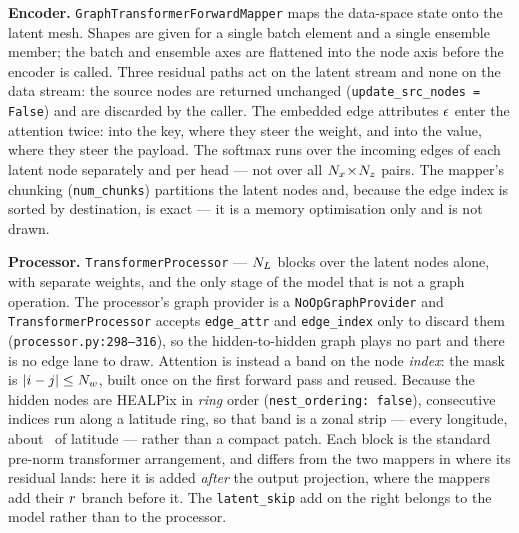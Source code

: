 \documentclass[11pt,landscape]{article}
\begin{document}
\vspace*{\fill}
\begin{center}
  \resizebox{\textwidth}{!}{}
\end{center}
\vspace*{\fill}

{\footnotesize
    \textbf{Encoder.}\;
    \texttt{GraphTransformerForwardMapper} maps the data-space
    state onto the latent mesh.
    Shapes are given for a single batch element and a
    single ensemble member; the batch and ensemble axes are flattened into the node
    axis before the encoder is called.
    Three residual paths act on the latent
    stream and none on the data stream: the source nodes are returned unchanged
    (\texttt{update\_src\_nodes = False}) and are discarded by the caller.
    The embedded edge attributes $\epsilon$ enter the
    attention twice: into the key, where they steer the weight, and into the value,
    where they steer the payload.
    The softmax runs over the incoming edges of each
    latent node separately and per head --- not over all $N_{x}\!\times\!N_{z}$ pairs.
    The mapper's chunking
    (\texttt{num\_chunks}) partitions the latent nodes and, because the edge index
    is sorted by destination, is exact --- it is a memory optimisation only and is
    not drawn.
\par}

\clearpage

\vspace*{\fill}
\begin{center}
  \resizebox{\textwidth}{!}{}
\end{center}
\vspace*{\fill}

{\footnotesize
    \textbf{Processor.}\;
    \texttt{TransformerProcessor} --- $N_{L}$ blocks over the latent nodes alone,
    with separate weights, and the only stage of the model that is not a graph
    operation.  The processor's graph provider is a \texttt{NoOpGraphProvider}
    and \texttt{TransformerProcessor} accepts \texttt{edge\_attr} and
    \texttt{edge\_index} only to discard them
    (\texttt{processor.py:298--316}), so the hidden-to-hidden graph plays no part
    and there is no edge lane to draw.
    Attention is instead a band on the node \emph{index}: the mask is
    $|i-j|\le N_{w}$, built once on the first forward pass and reused.  Because the
    hidden nodes are HEALPix in \emph{ring} order
    (\texttt{nest\_ordering: false}), consecutive indices run along a latitude
    ring, so that band is a zonal strip --- every longitude, about
    \valwindowlat\textdegree\ of latitude --- rather than a compact patch.
    Each block is the standard pre-norm transformer arrangement, and differs from
    the two mappers in where its residual lands: here it is added \emph{after}
    the output projection, where the mappers add their $r$ branch before it.
    The \texttt{latent\_skip} add on the right belongs to the model rather than to
    the processor.
\par}
\end{document}
